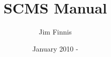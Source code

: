 
\title{SCMS Manual}
\date{January 2010 -}
\author{Jim Finnis}


\maketitle
\tableofcontents





















